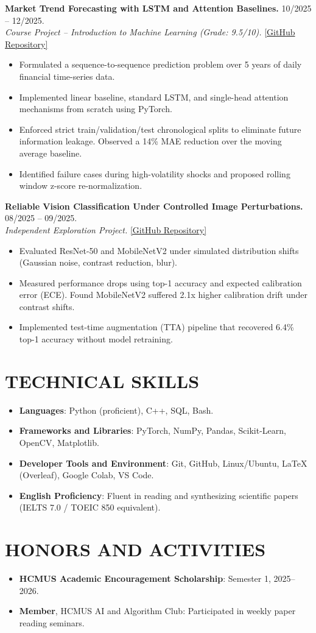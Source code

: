 \documentclass[10pt,a4paper]{article}
\begin{document}
\textbf{Market Trend Forecasting with LSTM and Attention Baselines.} \hfill 10/2025 -- 12/2025.\\
\textit{Course Project -- Introduction to Machine Learning (Grade: 9.5/10).} \hfill \href{https://github.com/username/project-lstm}{[GitHub Repository]}
\begin{itemize}
    \item Formulated a sequence-to-sequence prediction problem over 5 years of daily financial time-series data.
    \item Implemented linear baseline, standard LSTM, and single-head attention mechanisms from scratch using PyTorch.
    \item Enforced strict train/validation/test chronological splits to eliminate future information leakage. Observed a 14\% MAE reduction over the moving average baseline.
    \item Identified failure cases during high-volatility shocks and proposed rolling window z-score re-normalization.
\end{itemize}

\vspace{3pt}
\textbf{Reliable Vision Classification Under Controlled Image Perturbations.} \hfill 08/2025 -- 09/2025.\\
\textit{Independent Exploration Project.} \hfill \href{https://github.com/username/reliable-vision-eval}{[GitHub Repository]}
\begin{itemize}
    \item Evaluated ResNet-50 and MobileNetV2 under simulated distribution shifts (Gaussian noise, contrast reduction, blur).
    \item Measured performance drops using top-1 accuracy and expected calibration error (ECE). Found MobileNetV2 suffered 2.1x higher calibration drift under contrast shifts.
    \item Implemented test-time augmentation (TTA) pipeline that recovered 6.4\% top-1 accuracy without model retraining.
\end{itemize}

\section*{TECHNICAL SKILLS}
\begin{itemize}
    \item \textbf{Languages}: Python (proficient), C++, SQL, Bash.
    \item \textbf{Frameworks and Libraries}: PyTorch, NumPy, Pandas, Scikit-Learn, OpenCV, Matplotlib.
    \item \textbf{Developer Tools and Environment}: Git, GitHub, Linux/Ubuntu, LaTeX (Overleaf), Google Colab, VS Code.
    \item \textbf{English Proficiency}: Fluent in reading and synthesizing scientific papers (IELTS 7.0 / TOEIC 850 equivalent).
\end{itemize}

\section*{HONORS AND ACTIVITIES}
\begin{itemize}
    \item \textbf{HCMUS Academic Encouragement Scholarship}: Semester 1, 2025--2026.
    \item \textbf{Member}, HCMUS AI and Algorithm Club: Participated in weekly paper reading seminars.
\end{itemize}
\end{document}
